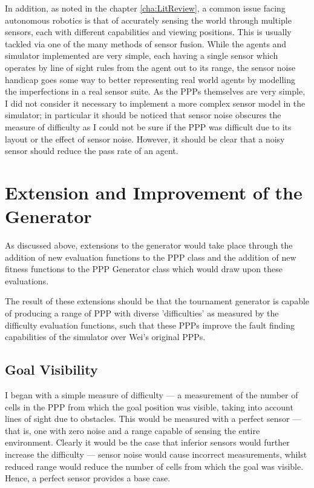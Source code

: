 \documentclass[authoryearcitations]{UoYCSproject}
\begin{document}
In addition, as noted in the chapter \ref{cha:LitReview}, a common issue facing autonomous robotics is that of accurately sensing the world through multiple sensors, each with different capabilities and viewing positions. This is usually tackled via one of the many methods of sensor fusion. While the agents and simulator implemented are very simple, each having a single sensor which operates by line of sight rules from the agent out to its range, the sensor noise handicap goes some way to better representing real world agents by modelling the imperfections in a real sensor suite. As the PPPs themselves are very simple, I did not consider it necessary to implement a more complex sensor model in the simulator; in particular it should be noticed that sensor noise obscures the measure of difficulty as I could not be sure if the PPP was difficult due to its layout or the effect of sensor noise. However, it should be clear that a noisy sensor should reduce the pass rate of an agent.

\section{Extension and Improvement of the Generator}
\label{sec:da_7}
As discussed above, extensions to the generator would take place through the addition of new evaluation functions to the PPP class and the addition of new fitness functions to the PPP Generator class which would draw upon these evaluations. 

The result of these extensions should be that the tournament generator is capable of producing a range of PPP with diverse 'difficulties' as measured by the difficulty evaluation functions, such that these PPPs improve the fault finding capabilities of the simulator over Wei's original PPPs.

\subsection{Goal Visibility}
\label{sec:goal_vis}
I began with a simple measure of difficulty --- a measurement of the number of cells in the PPP from which the goal position was visible, taking into account lines of sight due to obstacles. This would be measured with a perfect sensor --- that is, one with zero noise and a range capable of sensing the entire environment. Clearly it would be the case that inferior sensors would further increase the difficulty --- sensor noise would cause incorrect measurements, whilst reduced range would reduce the number of cells from which the goal was visible. Hence, a perfect sensor provides a base case.
\end{document}
